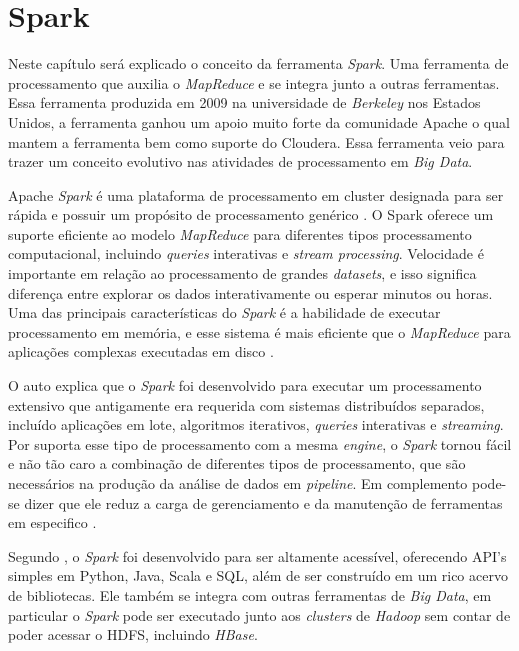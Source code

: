     \section{Spark}

        Neste capítulo será explicado o conceito da ferramenta \textit{Spark}. Uma ferramenta de processamento que auxilia o
        \textit{MapReduce} e se integra junto a outras ferramentas. Essa ferramenta produzida em 2009 na universidade de
        \textit{Berkeley} nos Estados Unidos, a ferramenta ganhou um apoio muito forte da comunidade Apache o qual mantem
        a ferramenta bem como suporte do Cloudera. Essa ferramenta veio para trazer um conceito evolutivo nas atividades de
        processamento em \textit{Big Data}.

        Apache \textit{Spark} é uma plataforma de processamento em cluster designada para ser rápida e possuir um propósito
        de processamento genérico \cite{karau2015}. O Spark oferece um suporte eficiente ao modelo \textit{MapReduce} para
        diferentes tipos processamento computacional, incluindo \textit{queries} interativas e \textit{stream processing}.
        Velocidade é importante em relação ao processamento de grandes \textit{datasets}, e isso significa diferença entre
        explorar os dados interativamente ou esperar minutos ou horas. Uma das principais características do \textit{Spark} é a
        habilidade de executar processamento em memória, e esse sistema é mais eficiente que o \textit{MapReduce} para
        aplicações complexas executadas em disco \cite{karau2015}.

        O auto  explica que o \textit{Spark} foi desenvolvido para executar um processamento extensivo que
        antigamente era requerida com sistemas distribuídos separados, incluído aplicações em lote, algoritmos iterativos, \textit{queries}
        interativas e \textit{streaming}. Por suporta esse tipo de processamento com a mesma \textit{engine}, o \textit{Spark}
        tornou fácil e não tão caro a combinação de diferentes tipos de processamento, que são necessários na produção da
        análise de dados em \textit{pipeline}. Em complemento pode-se dizer que ele reduz a carga de gerenciamento e da manutenção
        de ferramentas em especifico \cite{karau2015}.

        Segundo , o \textit{Spark} foi desenvolvido para ser altamente acessível, oferecendo API’s simples
        em Python, Java, Scala e SQL, além de ser construído em um rico acervo de bibliotecas. Ele também se integra com outras
        ferramentas de \textit{Big Data}, em particular o \textit{Spark} pode ser executado junto aos \textit{clusters} de
        \textit{Hadoop} sem contar de poder acessar o HDFS, incluindo \textit{HBase}.

